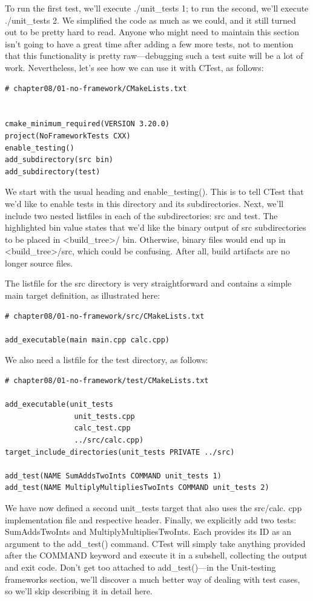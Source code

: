 To run the first test, we'll execute ./unit\_tests 1; to run the second, we'll execute ./unit\_tests 2. We simplified the code as much as we could, and it still turned out to be pretty hard to read. Anyone who might need to maintain this section isn't going to have a great time after adding a few more tests, not to mention that this functionality is pretty raw—debugging such a test suite will be a lot of work. Nevertheless, let's see how we can use it with CTest, as follows:

\begin{lstlisting}[style=styleCMake]
# chapter08/01-no-framework/CMakeLists.txt


cmake_minimum_required(VERSION 3.20.0)
project(NoFrameworkTests CXX)
enable_testing()
add_subdirectory(src bin)
add_subdirectory(test)
\end{lstlisting} 

We start with the usual heading and enable\_testing(). This is to tell CTest that we'd like to enable tests in this directory and its subdirectories. Next, we'll include two nested listfiles in each of the subdirectories: src and test. The highlighted bin value states that we'd like the binary output of src subdirectories to be placed in <build\_tree>/ bin. Otherwise, binary files would end up in <build\_tree>/src, which could be confusing. After all, build artifacts are no longer source files.

The listfile for the src directory is very straightforward and contains a simple main target definition, as illustrated here:

\begin{lstlisting}[style=styleCMake]
# chapter08/01-no-framework/src/CMakeLists.txt

add_executable(main main.cpp calc.cpp)
\end{lstlisting} 

We also need a listfile for the test directory, as follows:

\begin{lstlisting}[style=styleCMake]
# chapter08/01-no-framework/test/CMakeLists.txt

add_executable(unit_tests
				unit_tests.cpp
				calc_test.cpp
				../src/calc.cpp)
target_include_directories(unit_tests PRIVATE ../src)

add_test(NAME SumAddsTwoInts COMMAND unit_tests 1)
add_test(NAME MultiplyMultipliesTwoInts COMMAND unit_tests 2)
\end{lstlisting} 

We have now defined a second unit\_tests target that also uses the src/calc. cpp implementation file and respective header. Finally, we explicitly add two tests: SumAddsTwoInts and MultiplyMultipliesTwoInts. Each provides its ID as an argument to the add\_test() command. CTest will simply take anything provided after the COMMAND keyword and execute it in a subshell, collecting the output and exit code. Don't get too attached to add\_test()—in the Unit-testing frameworks section, we'll discover a much better way of dealing with test cases, so we'll skip describing it in detail here.

